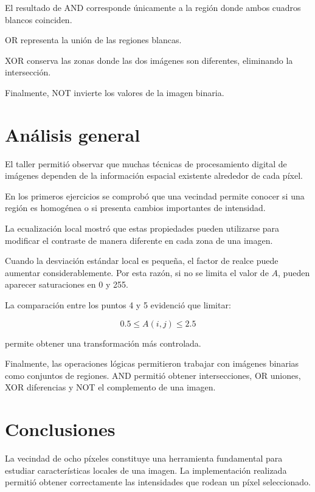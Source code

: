 \documentclass[11pt,letterpaper]{article}
\begin{document}
El resultado de AND corresponde únicamente a la región donde ambos cuadros blancos coinciden.

OR representa la unión de las regiones blancas.

XOR conserva las zonas donde las dos imágenes son diferentes, eliminando la intersección.

Finalmente, NOT invierte los valores de la imagen binaria.


\section{Análisis general}

El taller permitió observar que muchas técnicas de procesamiento digital de imágenes dependen de la información espacial existente alrededor de cada píxel.

En los primeros ejercicios se comprobó que una vecindad permite conocer si una región es homogénea o si presenta cambios importantes de intensidad.

La ecualización local mostró que estas propiedades pueden utilizarse para modificar el contraste de manera diferente en cada zona de una imagen.

Cuando la desviación estándar local es pequeña, el factor de realce puede aumentar considerablemente. Por esta razón, si no se limita el valor de $A$, pueden aparecer saturaciones en 0 y 255.

La comparación entre los puntos 4 y 5 evidenció que limitar:

\[
0.5 \leq A(i,j) \leq 2.5
\]

permite obtener una transformación más controlada.

Finalmente, las operaciones lógicas permitieron trabajar con imágenes binarias como conjuntos de regiones. AND permitió obtener intersecciones, OR uniones, XOR diferencias y NOT el complemento de una imagen.


\section{Conclusiones}

La vecindad de ocho píxeles constituye una herramienta fundamental para estudiar características locales de una imagen. La implementación realizada permitió obtener correctamente las intensidades que rodean un píxel seleccionado.
\end{document}
